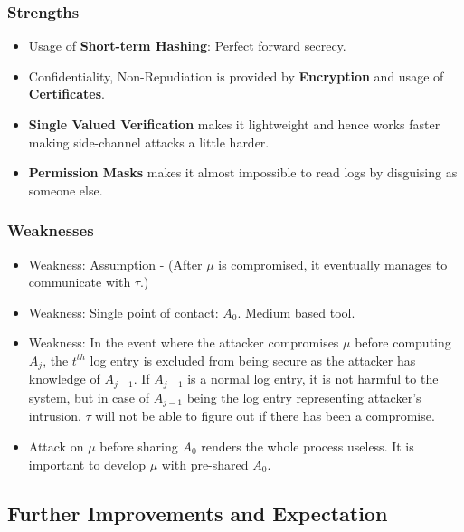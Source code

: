\documentclass[12pt, letter]{article}
\begin{document}
\subsubsection{Strengths}

\begin{itemize}
    \item Usage of \textbf{Short-term Hashing}: Perfect forward secrecy.
    
    \item Confidentiality, Non-Repudiation is provided by \textbf{Encryption} and usage of \textbf{Certificates}.
    
    \item \textbf{Single Valued Verification} makes it lightweight and hence works faster making side-channel attacks a little harder.
    
    \item \textbf{Permission Masks} makes it almost impossible to read logs by disguising as someone else.
\end{itemize}


\subsubsection{Weaknesses}

\begin{itemize}
    \item Weakness: Assumption - (After $\mu$ is compromised, it eventually manages to communicate with $\tau$.)
    
    \item Weakness: Single point of contact: $A_0$. Medium based tool.
    
    \item Weakness: In the event where the attacker compromises $\mu$ before computing $A_j$, the $t^{th}$ log entry is excluded from being secure as the attacker has knowledge of $A_{j-1}$. If $A_{j-1}$ is a normal log entry, it is not harmful to the system, but in case of $A_{j-1}$ being the log entry representing attacker's intrusion, $\tau$ will not be able to figure out if there has been a compromise.
    
    \item Attack on $\mu$ before sharing $A_0$ renders the whole process useless. It is important to develop $\mu$ with pre-shared $A_0$.
\end{itemize}

\subsection{Further Improvements and Expectation}
\end{document}
